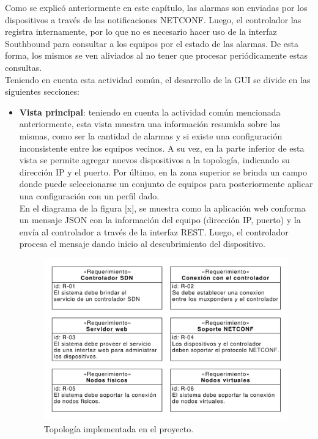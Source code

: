   Como se explicó anteriormente en este capítulo, las alarmas son enviadas por los dispositivos a través de las notificaciones NETCONF. Luego, el controlador las registra internamente, por lo que no es necesario hacer uso de la interfaz Southbound para consultar a los equipos por el estado de las alarmas. De esta forma, los mismos se ven aliviados al no tener que procesar periódicamente estas consultas.
  \\

  Teniendo en cuenta esta actividad común, el desarrollo de la GUI se divide en las siguientes secciones:

  \begin{itemize}
	\item \textbf{Vista principal}: teniendo en cuenta la actividad común mencionada anteriormente, esta vista muestra una información resumida sobre las mismas, como ser la cantidad de alarmas y si existe una configuración inconsistente entre los equipos vecinos. A su vez, en la parte inferior de esta vista se permite agregar nuevos dispositivos a la topología, indicando su dirección IP y el puerto. Por último, en la zona superior se brinda un campo donde puede seleccionarse un conjunto de equipos para posteriormente aplicar una configuración con un perfil dado.
    \\

    En el diagrama de la figura [x], se muestra como la aplicación web conforma un mensaje JSON con la información del equipo (dirección IP, puerto) y la envía al controlador a través de la interfaz REST. Luego, el controlador procesa el mensaje dando inicio al descubrimiento del dispositivo.

    \begin{figure}[H]
        \centering
        \includegraphics[scale=0.65]{Figures/req_sys.pdf}
        \caption{Topología implementada en el proyecto.}
        \label{fig:req_sys}
      \end{figure}


\end{itemize}
